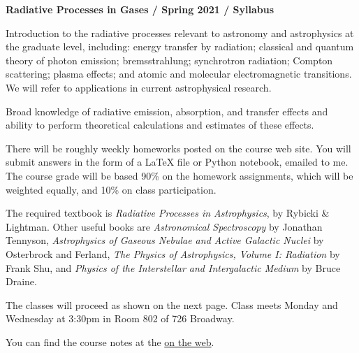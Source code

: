 \documentclass[11pt]{article}
\begin{document}
\begin{center}
  {\bf Radiative Processes in Gases / Spring 2021 / Syllabus }
\end{center}


 Introduction to the radiative
processes relevant to astronomy and astrophysics at the graduate
level, including: energy transfer by radiation; classical and quantum
theory of photon emission; bremsstrahlung; synchrotron radiation;
Compton scattering; plasma effects; and atomic and molecular
electromagnetic transitions.  We will refer to applications in current
astrophysical research.

 Broad knowledge of radiative
emission, absorption, and transfer effects and ability to perform
theoretical calculations and estimates of these effects.

 There will be roughly weekly homeworks
posted on the course web site.  You will submit answers in the form of
a LaTeX file or Python notebook, emailed to me. The course grade will
be based 90\% on the homework assignments, which will be
weighted equally, and 10\% on class participation.

 The required textbook is {\it Radiative
  Processes in Astrophysics}, by Rybicki \& Lightman. Other useful
books are {\it Astronomical Spectroscopy} by Jonathan Tennyson, {\it
  Astrophysics of Gaseous Nebulae and Active Galactic Nuclei} by
Osterbrock and Ferland, {\it The Physics of Astrophysics, Volume
  I: Radiation} by Frank Shu, and {\it Physics of the Interstellar and
  Intergalactic Medium} by Bruce Draine.

\noindent The classes will proceed as shown on the next page.  Class
meets Monday and Wednesday at 3:30pm in Room 802 of 726 Broadway.

\noindent You can find the course notes at the
\href{https://github.com/blanton144/radiative/tree/main/docs/pdf}{on the web}. 

\end{document}
